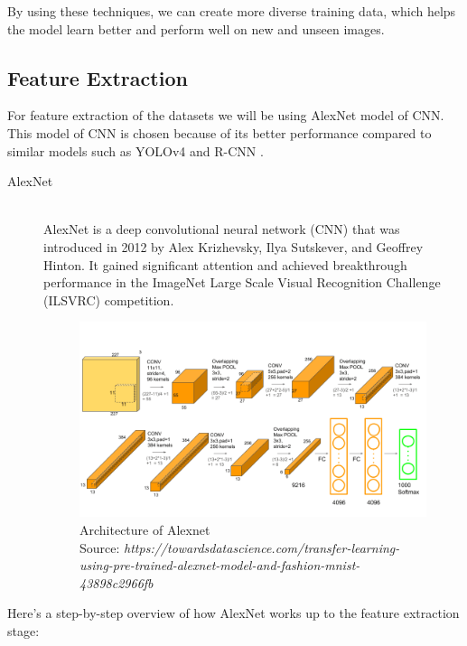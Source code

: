 By using these techniques, we can create more diverse training data, which helps the model learn better and perform well on new and unseen images.




\subsection{Feature Extraction}
\vspace{-18pt}
For feature extraction of the datasets we will be using AlexNet model of CNN. This model of CNN is chosen because of its better performance compared to similar models such as YOLOv4 and R-CNN \cite{Mirchandani}.

\begin{description}
\item[AlexNet] \hfill \\
AlexNet is a deep convolutional neural network (CNN) that was introduced in 2012 by Alex Krizhevsky, Ilya Sutskever, and Geoffrey Hinton. It gained significant attention and achieved breakthrough performance in the ImageNet Large Scale Visual Recognition Challenge (ILSVRC) competition.
\begin{figure}[tbh] %
\begin{center}
	\includegraphics[width=4in]{images/Alexnet2.png}
	\caption[Architecture of Alexnet]{\centering Architecture of Alexnet \\Source: \textit{https://towardsdatascience.com/transfer-learning-using-pre-trained-alexnet-model-and-fashion-mnist-43898c2966fb}} %
	
	\label{Architecture of Alexnet } %
	
\end{center}
\end{figure}
\end{description}
Here's a step-by-step overview of how AlexNet works up to the feature extraction stage:
